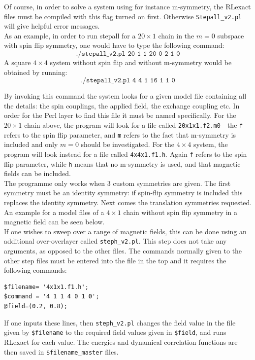 \documentclass{article}
\begin{document}
	Of course, in order to solve a system using for instance m-symmetry, the RLexact files must be compiled with this flag turned on first. Otherwise \texttt{Stepall\_v2.pl} will give helpful error messages.\\
	 
	As an example, in order to run stepall for a $20 \times 1$ chain in the $m = 0$ subspace with spin flip symmetry, one would have to type the following command:
	\begin{equation*}
		\texttt{./stepall\_v2.pl 20 1 1 20 0 2 1 0}
	\end{equation*}
	A square $4 \times 4$ system without spin flip and without m-symmetry would be obtained by running:
	\begin{equation*}
		\texttt{./stepall\_v2.pl 4 4 1 16 1 1 0}
	\end{equation*}
	
By invoking this command the system looks for a given model file containing all the details: the spin couplings, the applied field, the exchange coupling etc. In order for the Perl layer to find this file it must be named specifically. For the $20 \times 1$ chain above, the program will look for a file called \texttt{20x1x1.f2.m0} - the \texttt{f} refers to the spin flip parameter, and \texttt{m} refers to the fact that m-symmetry is included and only $m=0$ should be investigated. For the $4 \times 4$ system, the program will look instead for a file called \texttt{4x4x1.f1.h}. Again \texttt{f} refers to the spin flip parameter, while \texttt{h} means that no m-symmetry is used, and that magnetic fields can be included.\\

The programme only works when 3 custom symmetries are given. The first symmetry must be an identity symmetry: if spin-flip symmetry is included this replaces the identity symmetry. Next comes the translation symmetries requested. An example for a model files of a $4 \times 1$ chain without spin flip symmetry in a magnetic field can be seen below. \\

If one wishes to sweep over a range of magnetic fields, this can be done using an additional over-overlayer called \texttt{steph\_v2.pl}. This step does not take any arguments, as opposed to the other files. The commands normally given to the other step files must be entered into the file in the top and it requires the following commands:
\begin{lstlisting}
$filename= '4x1x1.f1.h';
$command = '4 1 1 4 0 1 0';
@field=(0.2, 0.8);
\end{lstlisting}
If one inputs these lines, then \texttt{steph\_v2.pl} changes the field value in the file given by \texttt{\$filename} to the required field values given in \texttt{\$field}, and runs RLexact for each value. The energies and dynamical correlation functions are then saved in \texttt{\$filename\_master} files.
\end{document}
